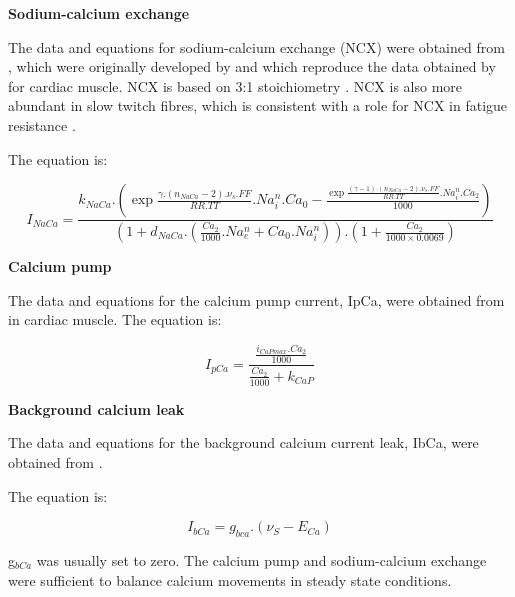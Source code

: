 \documentclass[fleqn,10pt]{physiome}
\begin{document}
\textbf{Sodium-calcium exchange}\newline

The data and equations for sodium-calcium exchange (NCX) were obtained from \citet{noble1991role}, which were originally developed by \citet{di1985model} and which reproduce the data obtained by \citet{kimura1987identification} for cardiac muscle. NCX is based on 3:1 stoichiometry \citep{michel2014function}. NCX is also more abundant in slow twitch fibres, which is consistent with a role for NCX in fatigue resistance \citep{michel2014function}.\newline

The equation is:\newline

\begin{equation}
    I_{NaCa} = \frac{k_{NaCa}.(\exp{\frac{\gamma.(n_{NaCa}-2).\nu_{s}.FF}{RR.TT}}.Na_i^{n}.Ca_{0}-\frac{\exp{\frac{(\gamma-1).(n_{NaCa}-2).\nu_{s}.FF}{RR.TT}}.Na_i^{n}.Ca_{2}}{1000})}{(1+d_{NaCa}.(\frac{Ca_2}{1000}.Na_e^n+Ca_0.Na_i^n)).(1+\frac{Ca_2}{1000\times0.0069})}
\end{equation}

\textbf{Calcium pump}\newline

The data and equations for the calcium pump current, IpCa, were obtained from
\citet{lindblad1996model} in cardiac muscle.\newline
The equation is:\newline

\begin{equation}
    I_{pCa} = \frac{\frac{i_{CaPmax}.Ca_2}{1000}}{\frac{Ca_2}{1000}+k_{CaP}}
\end{equation}

\textbf{Background calcium leak}\newline

The data and equations for the background calcium current leak, IbCa, were obtained from \citet{noble1991role}.\newline

The equation is: \newline

\begin{equation}
    I_{bCa} = g_{bca}.(\nu_S - E_{Ca})
\end{equation}

g$_{bCa}$ was usually set to zero. The calcium pump and sodium-calcium exchange were sufficient to balance calcium movements in steady state conditions. 
\end{document}
